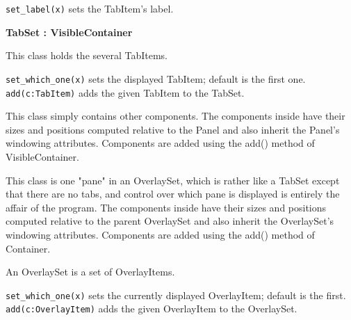 \texttt{set\_label(x)} sets the TabItem's label.

{\ttfamily\bfseries
{}TabSet : VisibleContainer}

This class holds the several TabItems.

\texttt{set\_which\_one(x)} sets the displayed TabItem;
default is the first one.\\
\texttt{add(c:TabItem)} adds the given TabItem to the TabSet.


This class simply contains other components. The components inside have
their sizes and positions computed relative to the Panel and also
inherit the Panel's windowing attributes. Components
are added using the add() method of VisibleContainer.


This class is one "pane" in an OverlaySet,
which is rather like a TabSet except that there are no tabs, and
control over which pane is displayed is entirely the affair of the
program. The components inside have their sizes and positions computed
relative to the parent OverlaySet and also inherit the
OverlaySet's windowing attributes. Components are
added using the add() method of Container.


An OverlaySet is a set of OverlayItems.

\texttt{set\_which\_one(x)} sets the currently displayed OverlayItem;
default is the first.\\
\texttt{add(c:OverlayItem)} adds the given OverlayItem to the OverlaySet.
